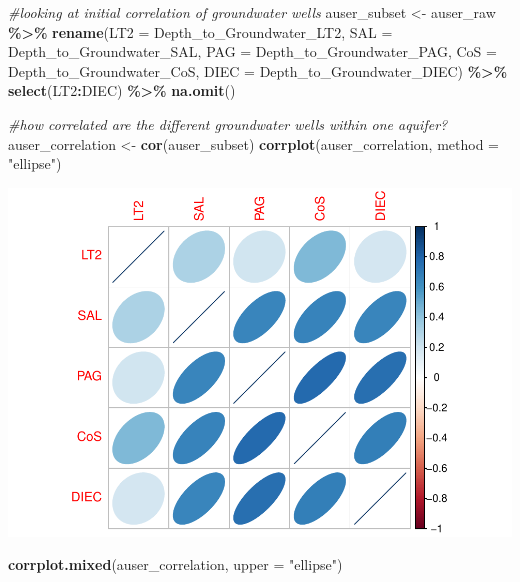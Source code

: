 \documentclass[
]{article}
\newenvironment{Shaded}{\begin{snugshade}}{\end{snugshade}}
\newcommand{\AttributeTok}[1]{\textcolor[rgb]{0.13,0.29,0.53}{#1}}
\newcommand{\CommentTok}[1]{\textcolor[rgb]{0.56,0.35,0.01}{\textit{#1}}}
\newcommand{\FunctionTok}[1]{\textcolor[rgb]{0.13,0.29,0.53}{\textbf{#1}}}
\newcommand{\NormalTok}[1]{#1}
\newcommand{\OtherTok}[1]{\textcolor[rgb]{0.56,0.35,0.01}{#1}}
\newcommand{\SpecialCharTok}[1]{\textcolor[rgb]{0.81,0.36,0.00}{\textbf{#1}}}
\newcommand{\StringTok}[1]{\textcolor[rgb]{0.31,0.60,0.02}{#1}}
\begin{document}
\begin{Shaded}
\begin{Highlighting}[]
\CommentTok{\#looking at initial correlation of groundwater wells}
\NormalTok{auser\_subset }\OtherTok{\textless{}{-}}\NormalTok{ auser\_raw }\SpecialCharTok{\%\textgreater{}\%}
  \FunctionTok{rename}\NormalTok{(}\AttributeTok{LT2 =}\NormalTok{ Depth\_to\_Groundwater\_LT2,}
         \AttributeTok{SAL =}\NormalTok{ Depth\_to\_Groundwater\_SAL,}
         \AttributeTok{PAG =}\NormalTok{ Depth\_to\_Groundwater\_PAG,}
         \AttributeTok{CoS =}\NormalTok{ Depth\_to\_Groundwater\_CoS,}
         \AttributeTok{DIEC =}\NormalTok{ Depth\_to\_Groundwater\_DIEC) }\SpecialCharTok{\%\textgreater{}\%}
  \FunctionTok{select}\NormalTok{(LT2}\SpecialCharTok{:}\NormalTok{DIEC) }\SpecialCharTok{\%\textgreater{}\%}
  \FunctionTok{na.omit}\NormalTok{()}

\CommentTok{\#how correlated are the different groundwater wells within one aquifer?}
\NormalTok{auser\_correlation }\OtherTok{\textless{}{-}} \FunctionTok{cor}\NormalTok{(auser\_subset)}
\FunctionTok{corrplot}\NormalTok{(auser\_correlation, }\AttributeTok{method =} \StringTok{"ellipse"}\NormalTok{)}
\end{Highlighting}
\end{Shaded}

\includegraphics{Kaufman_McNeill_ENV797_Project_files/figure-latex/correlation plots-1.pdf}

\begin{Shaded}
\begin{Highlighting}[]
\FunctionTok{corrplot.mixed}\NormalTok{(auser\_correlation, }\AttributeTok{upper =} \StringTok{"ellipse"}\NormalTok{)}
\end{Highlighting}
\end{Shaded}
\end{document}
